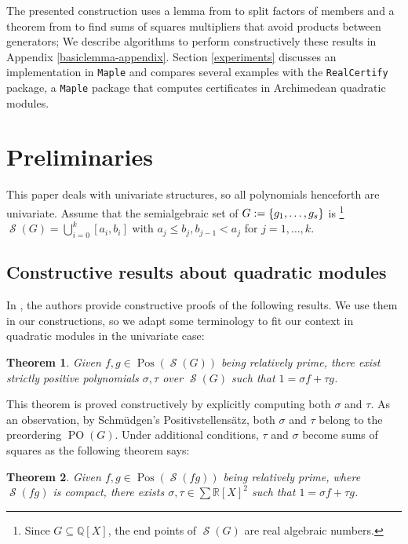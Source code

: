 \documentclass[preprint,12pt,authoryear]{elsarticle}
\newtheorem{theorem}{Theorem}[section]
\newcommand{\rX}{\mathbb{R}[X]}
\newcommand{\qX}{\mathbb{Q}[X]}
\DeclarePairedDelimiter{\set}{\lbrace}{\rbrace}
\DeclareMathOperator{\semialgebraic}{\mathcal{S}}
\DeclareMathOperator{\PO}{PO}
\DeclareMathOperator{\Pos}{Pos}
\newcommand{\maple}{\texttt{Maple}\xspace}
\newcommand{\rc}{\texttt{RealCertify}\xspace}
\begin{document}
The presented construction uses a lemma from \cite[Theorem 3.2, page
590]{marshall2005} to split factors of members and a theorem from
\cite[Proposition 4.8, page 1058]{scheiderer2000} to find sums of squares
multipliers that avoid products between generators; We describe algorithms to
perform constructively these results in Appendix
\ref{basiclemma-appendix}. Section \ref{experiments} discusses an implementation
in \maple and compares several examples with the \rc package, a \maple package
that computes certificates in Archimedean quadratic modules.

 \section{Preliminaries}

This paper deals with univariate structures, so all polynomials henceforth are
univariate. Assume that the semialgebraic set of $G := \set{g_1, \dots, g_s}$ is
\footnote{Since $G \subseteq \qX$, the end points of $\semialgebraic(G)$ are
  real algebraic numbers.}  $\semialgebraic(G) = \bigcup_{i=0}^{k}{[a_i, b_i]}$
with $a_j \leq b_j, b_{j-1} < a_j$ for $j = 1, \dots, k$. 

\subsection{Constructive results about quadratic modules}


In \cite{marshall2005}, the authors provide constructive proofs of the
following results. We use them in our constructions, so we adapt some
terminology to fit our context in quadratic modules in the univariate case:

\begin{theorem} \cite[Basic Lemma (Lemma 2.1)]{marshall2005}
  \th\label{sec:results-} Given $f, g \in \Pos(\semialgebraic(G))$ being
  relatively prime, there exist strictly positive polynomials $\sigma, \tau$
  over $\semialgebraic(G)$ such that $1 = \sigma f + \tau g$.
\end{theorem}

This theorem is proved constructively by explicitly computing both $\sigma$ and
$\tau$. As an observation, by Schm\"udgen's Positivstellens\"atz, both $\sigma$
and $\tau$ belong to the preordering $\PO(G)$. Under additional conditions, $\tau$
and $\sigma$ become sums of squares as the following theorem says:

\begin{theorem} \cite[Corollary 2.3 (i)]{marshall2005}
  \th\label{sec:results--1}
  Given  $f, g \in \Pos(\semialgebraic(f
  g))$ being relatively prime, where $\semialgebraic(f g)$ is compact,   
  there exists $\sigma, \tau \in \sum{\rX}^2$ such that
  $1 = \sigma f + \tau g$. 
\end{theorem}
\end{document}
